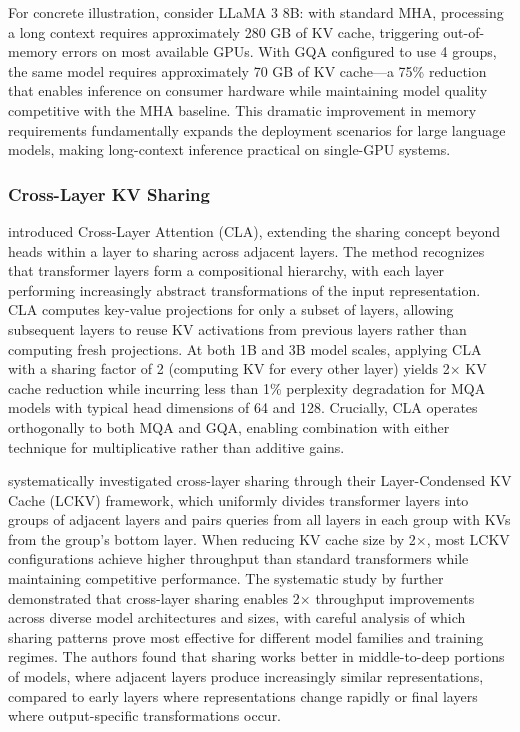 For concrete illustration, consider LLaMA 3 8B: with standard MHA, processing a long context requires approximately 280 GB of KV cache, triggering out-of-memory errors on most available GPUs. With GQA configured to use 4 groups, the same model requires approximately 70 GB of KV cache---a 75\% reduction that enables inference on consumer hardware while maintaining model quality competitive with the MHA baseline. This dramatic improvement in memory requirements fundamentally expands the deployment scenarios for large language models, making long-context inference practical on single-GPU systems.

\subsubsection{Cross-Layer KV Sharing}

\citet{brandon2024reducing} introduced Cross-Layer Attention (CLA), extending the sharing concept beyond heads within a layer to sharing across adjacent layers. The method recognizes that transformer layers form a compositional hierarchy, with each layer performing increasingly abstract transformations of the input representation. CLA computes key-value projections for only a subset of layers, allowing subsequent layers to reuse KV activations from previous layers rather than computing fresh projections. At both 1B and 3B model scales, applying CLA with a sharing factor of 2 (computing KV for every other layer) yields 2$\times$ KV cache reduction while incurring less than 1\% perplexity degradation for MQA models with typical head dimensions of 64 and 128. Crucially, CLA operates orthogonally to both MQA and GQA, enabling combination with either technique for multiplicative rather than additive gains.

\citet{yang2024layercondensed} systematically investigated cross-layer sharing through their Layer-Condensed KV Cache (LCKV) framework, which uniformly divides transformer layers into groups of adjacent layers and pairs queries from all layers in each group with KVs from the group's bottom layer. When reducing KV cache size by 2$\times$, most LCKV configurations achieve higher throughput than standard transformers while maintaining competitive performance. The systematic study by \citet{tu2024systematic} further demonstrated that cross-layer sharing enables 2$\times$ throughput improvements across diverse model architectures and sizes, with careful analysis of which sharing patterns prove most effective for different model families and training regimes. The authors found that sharing works better in middle-to-deep portions of models, where adjacent layers produce increasingly similar representations, compared to early layers where representations change rapidly or final layers where output-specific transformations occur.

